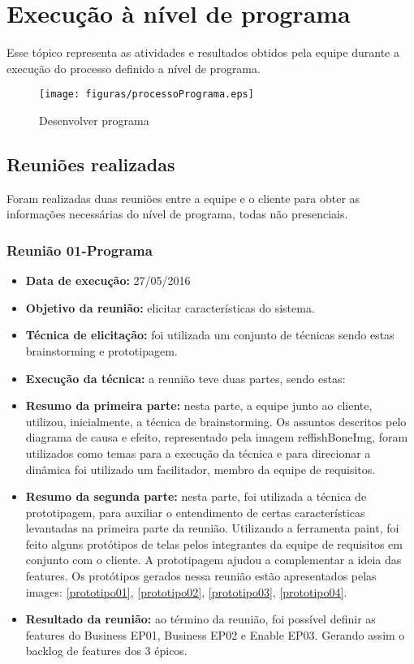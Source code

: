 \chapter[Execução à nível de programa]{Execução à nível de programa}

Esse tópico representa as atividades e resultados obtidos pela equipe durante a execução do processo definido a nível de programa.

\begin{figure}[H]
    \centering
    \caption{Desenvolver programa}
    \label{processoPrograma}
    \texttt{[image: figuras/processoPrograma.eps]}
\end{figure}
\section{Reuniões realizadas}

Foram realizadas duas reuniões entre a equipe e o cliente para obter as informações necessárias do nível de programa, todas não presenciais.

\subsection{Reunião 01-Programa}
\begin{itemize}
    \item \textbf{Data de execução:} 27/05/2016\\
    \item \textbf{Objetivo da reunião:} elicitar características do sistema.
    \item \textbf{Técnica de elicitação:} foi utilizada um conjunto de técnicas sendo estas brainstorming e prototipagem.
    \item \textbf{Execução da técnica:} a reunião teve duas partes, sendo estas:
    \item \textbf{Resumo da primeira parte:} nesta parte, a equipe junto ao cliente, utilizou, inicialmente, a técnica de brainstorming. Os assuntos descritos pelo diagrama de causa e efeito, representado pela imagem ref{fishBoneImg}, foram utilizados como temas para a execução da técnica e para direcionar a dinâmica foi utilizado um facilitador, membro da equipe de requisitos.
    \item \textbf{Resumo da segunda parte:} nesta parte, foi utilizada a técnica de prototipagem, para auxiliar o entendimento de certas características levantadas na primeira parte da reunião. Utilizando a ferramenta paint, foi feito alguns protótipos de telas pelos integrantes da equipe de requisitos em conjunto com o cliente. 
    A prototipagem ajudou a complementar a ideia das features. Os protótipos gerados nessa reunião estão apresentados pelas images:  \ref{prototipo01}, \ref{prototipo02}, \ref{prototipo03}, \ref{prototipo04}.
    \item \textbf{Resultado da reunião:} ao término da reunião, foi possível definir as features do Business EP01, Business EP02 e Enable EP03. Gerando assim o backlog de features dos 3 épicos. 
\end{itemize}
